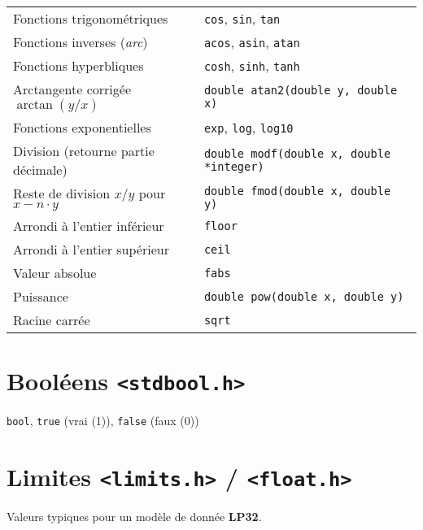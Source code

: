 \documentclass{article}
\newcommand{\cd}{\lstinline}
\begin{document}
\begin{multicols*}{3}
\begin{tabularx}{\linewidth}{Xl}
  Fonctions trigonométriques & \cd{cos}, \cd{sin}, \cd{tan} \\
  Fonctions inverses (\emph{arc}) & \cd{acos}, \cd{asin}, \cd{atan} \\
  Fonctions hyperbliques & \cd{cosh}, \cd{sinh}, \cd{tanh} \\
  Arctangente corrigée $\arctan(y / x)$ & \cd{double atan2(double y, double x)} \\
  Fonctions exponentielles & \cd{exp}, \cd{log}, \cd{log10} \\
  Division (retourne partie décimale) & \cd{double modf(double x, double *integer)} \\
  Reste de division $x/y$ pour $x - n \cdot y$ & \cd{double fmod(double x, double y)} \\
  Arrondi à l'entier inférieur & \cd{floor} \\
  Arrondi à l'entier supérieur & \cd{ceil} \\
  Valeur absolue & \cd{fabs} \\
  Puissance & \cd{double pow(double x, double y)} \\
  Racine carrée & \cd{sqrt} \\
\end{tabularx}

\section*{Booléens \texttt{<stdbool.h>}}

\cd{bool}, \cd{true} (vrai (1)), \cd{false} (faux (0))

\section*{Limites \texttt{<limits.h>} / \texttt{<float.h>}}

Valeurs typiques pour un modèle de donnée \textbf{LP32}.


\end{multicols*}
\end{document}
